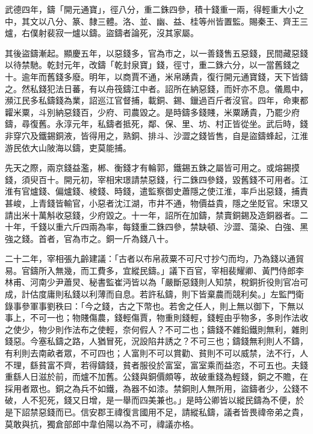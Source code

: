 \begin{pinyinscope}
 武德四年，鑄「開元通寶」，徑八分，重二銖四參，積十錢重一兩，得輕重大小之中，其文以八分、篆、隸三體。洛、並、幽、益、桂等州皆置監。賜秦王、齊王三爐，右僕射裴寂一爐以鑄。盜鑄者論死，沒其家屬。



 其後盜鑄漸起。顯慶五年，以惡錢多，官為市之，以一善錢售五惡錢，民間藏惡錢以待禁馳。乾封元年，改鑄「乾封泉寶」錢，徑寸，重二銖六分，以一當舊錢之十。逾年而舊錢多廢。明年，以商賈不通，米帛踴貴，復行開元通寶錢，天下皆鑄之。然私錢犯法日蕃，有以舟筏鑄江中者。詔所在納惡錢，而奸亦不息。儀鳳中，瀕江民多私鑄錢為業，詔巡江官督捕，載銅、錫、鑞過百斤者沒官。四年，命東都糶米粟，斗別納惡錢百，少府、司農毀之。是時鑄多錢賤，米粟踴貴，乃罷少府鑄，尋復舊。永淳元年，私鑄者抵死，鄰、保、里、坊、村正皆從坐。武后時，錢非穿穴及鐵錫銅液，皆得用之，熟銅、排斗、沙澀之錢皆售，自是盜鑄蜂起，江淮游民依大山陂海以鑄，吏莫能捕。



 先天之際，兩京錢益濫，郴、衡錢才有輪郭，鐵錫五銖之屬皆可用之。或熔錫摸錢，須臾百十。開元初，宰相宋璟請禁惡錢，行二銖四參錢，毀舊錢不可用者。江淮有官爐錢、偏爐錢、棱錢、時錢，遣監察御史蕭隱之使江淮，率戶出惡錢，捕責甚峻，上青錢皆輸官，小惡者沈江湖，市井不通，物價益貴，隱之坐貶官。宋璟又請出米十萬斛收惡錢，少府毀之。十一年，詔所在加鑄，禁賣銅錫及造銅器者。二十年，千錢以重六斤四兩為率，每錢重二銖四參，禁缺頓、沙澀、蕩染、白強、黑強之錢。首者，官為市之。銅一斤為錢八十。



 二十二年，宰相張九齡建議：「古者以布帛菽粟不可尺寸抄勺而均，乃為錢以通貿易。官鑄所入無幾，而工費多，宜縱民鑄。」議下百官，宰相裴耀卿、黃門侍郎李林甫、河南少尹蕭炅、秘書監崔沔皆以為「嚴斷惡錢則人知禁，稅銅折役則官冶可成，計估度庸則私錢以利薄而自息。若許私鑄，則下皆棄農而競利矣。」左監門衛錄事參軍事劉秩曰：「今之錢，古之下幣也。若舍之任人，則上無以御下，下無以事上，不可一也；物賤傷農，錢輕傷賈，物重則錢輕，錢輕由乎物多，多則作法收之使少，物少則作法布之使輕，奈何假人？不可二也；鑄錢不雜鉛鐵則無利，雜則錢惡。今塞私鑄之路，人猶冒死，況設陷井誘之？不可三也；鑄錢無利則人不鑄，有利則去南畝者眾，不可四也；人富則不可以賞勸、貧則不可以威禁，法不行，人不理，繇貧富不齊，若得鑄錢，貧者服役於富室，富室乘而益恣，不可五也。夫錢重繇人日滋於前，而爐不加舊。公錢與銅價頗等，故破重錢為輕錢，銅之不贍，在採用者眾也。銅之為兵不如鐵，為器不如漆。禁銅則人無所用，盜鑄者少，公錢不破，人不犯死，錢又日增，是一舉而四美兼也。」是時公卿皆以縱民鑄為不便，於是下詔禁惡錢而已。信安郡王禕復言國用不足，請縱私鑄，議者皆畏禕帝弟之貴，莫敢與抗，獨倉部郎中韋伯陽以為不可，禕議亦格。




\end{pinyinscope}

